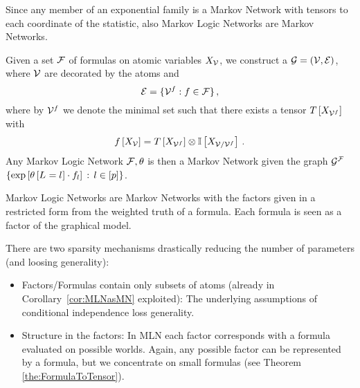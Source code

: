 % 
Since any member of an exponential family is a Markov Network with tensors to each coordinate of the statistic, also Markov Logic Networks are Markov Networks.

\begin{corollary}\label{cor:MLNasMN}
	Given a set $\mathcal{F}$ of formulas on atomic variables $X_{\mathcal{V}}$, we construct a $\mathcal{G}=(\mathcal{V},\mathcal{E})$, where $\mathcal{V}$ are decorated by the atoms and
		\[ \mathcal{E} = \{ \mathcal{V}^{f}: f\in\mathcal{F} \} \, , \]
	where by $\mathcal{V}^{f}$ we denote the minimal set such that there exists a tensor $T\left[X_{\mathcal{V}^{f}}\right]$ with
		\[ f\left[X_{\mathcal{V}}\right] = T\left[X_{\mathcal{V}^{f}}\right] \otimes \mathbb{I}\left[X_{\mathcal{V}/\mathcal{V}^{f}}\right] \, . \]		
	Any Markov Logic Network $\mathcal{F},\theta$ is then a Markov Network given the graph $\mathcal{G}^{\mathcal{F}}$
	$\{\mathrm{exp}\left[\theta\left[L_{}=l_{}\right]\cdot f_{l}\right]
\, :\,l\in[p]\}$.
\end{corollary}


Markov Logic Networks are Markov Networks with the factors given in a restricted form from the weighted truth of a formula.
Each formula is seen as a factor of the graphical model.

There are two sparsity mechanisms drastically reducing the number of parameters (and loosing generality):
\begin{itemize}
	\item Factors/Formulas contain only subsets of atoms (already in Corollary~\ref{cor:MLNasMN} exploited):
		The underlying assumptions of conditional independence loss generality.
	\item Structure in the factors: In MLN each factor corresponds with a formula evaluated on possible worlds.
		Again, any possible factor can be represented by a formula, but we concentrate on small formulas (see Theorem \ref{the:FormulaToTensor}).
\end{itemize}


% 


